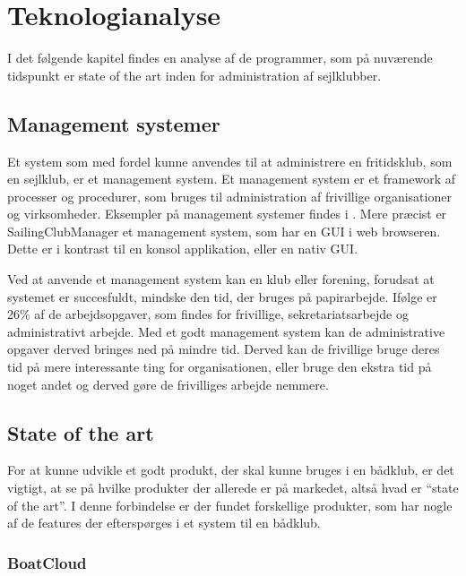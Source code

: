 \chapter{Teknologianalyse}\label{chap:teknologi-analyse}

I det følgende kapitel findes en analyse af de programmer, som på nuværende
tidspunkt er state of the art inden for administration af sejlklubber.


\section{Management systemer}\label{subsec:management-systemer}

Et system som med fordel kunne anvendes til at administrere en fritidsklub, som en sejlklub, er et management system. Et management system er et
framework af processer og procedurer, som bruges til administration af frivillige organisationer og
virksomheder. 
Eksempler på management systemer findes i . 
Mere præcist er SailingClubManager et management system, som har en \ac{GUI} i web browseren. Dette er i kontrast til en konsol applikation, eller en nativ \ac{GUI}.

Ved at anvende et management system kan en klub eller forening, forudsat at systemet er succesfuldt, mindske den
tid, der bruges på papirarbejde. Ifølge
\citet{Frivilligrapporten} er 26\% af de arbejdsopgaver, som findes for frivillige, sekretariatsarbejde og
administrativt arbejde. 
Med et godt management system kan de administrative opgaver derved bringes ned på mindre tid. 
Derved kan de frivillige bruge deres tid på mere interessante ting for organisationen, eller bruge den ekstra tid på noget andet og derved gøre de frivilliges arbejde nemmere.


\section{State of the art}\label{sec:sota}

For at kunne udvikle et godt produkt, der skal kunne bruges i en bådklub, er det vigtigt, at se på hvilke
produkter der allerede er på markedet, altså hvad er ``state of the art''. 
I denne forbindelse er der fundet forskellige produkter, som har nogle af de features der efterspørges i et system til en bådklub.


\subsection*{BoatCloud}

